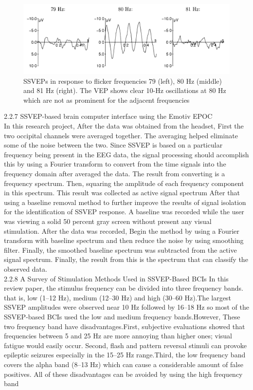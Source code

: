 \begin{figure}[h]
	\centering
  	\includegraphics[scale = 0.25]{28.pdf}
  	\caption{ SSVEPs in response to flicker frequencies 79 (left), 80 Hz (middle) and 81 Hz (right). The VEP shows clear 10-Hz oscillations at 80 Hz which are not as prominent for the adjacent frequencies}
\end{figure}


2.2.7 SSVEP-based brain computer interface using the Emotiv EPOC\\
In this research project, After the data was obtained from the headset, First the two occipital channels were averaged together. The averaging helped eliminate some of the noise between the two. Since SSVEP is based on a particular frequency being present in the EEG data, the signal processing should accomplish this by using a Fourier transform to convert from the time signals into the frequency domain after averaged the data. The result from converting is a frequency spectrum. Then, squaring the amplitude of each frequency component in this spectrum. This result was collected as active signal spectrum      After that using a baseline removal method to further improve the results of signal isolation for the identification of SSVEP response. A baseline was recorded while the user was viewing a solid 50 percent gray screen without present any visual stimulation. After the data was recorded, Begin the method by using a Fourier transform with baseline spectrum and then reduce the noise by using smoothing filter. Finally, the smoothed baseline spectrum was subtracted from the active signal spectrum. Finally, the result from this is the spectrum that can classify the observed data.\\ 

2.2.8 A Survey of Stimulation Methods Used in SSVEP-Based BCIs
In this review paper, the stimulus frequency can be divided into three frequency bands. that is, low (1–12 Hz), medium (12–30 Hz) and high (30–60 Hz).The largest SSVEP amplitudes were observed near 10 Hz followed by 16–18 Hz so most of the SSVEP-based BCIs used the low and medium frequency bands.However, These two frequency band have disadvantages.First, subjective evaluations showed that frequencies between 5 and 25 Hz are more annoying than higher ones; visual fatigue would easily occur. Second, flash and pattern reversal stimuli can
provoke epileptic seizures especially in the 15–25 Hz range.Third, the low frequency band covers the alpha band (8–13 Hz) which can cause a considerable amount of false positives. All of these disadvantages can be avoided by using the high frequency band    